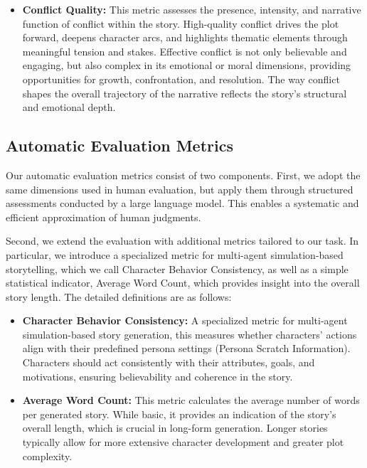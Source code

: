 \documentclass[letterpaper]{article} %
\begin{document}
\begin{itemize}
  \item \textbf{Conflict Quality:} This metric assesses the presence, intensity, and narrative function of conflict within the story. High-quality conflict drives the plot forward, deepens character arcs, and highlights thematic elements through meaningful tension and stakes. Effective conflict is not only believable and engaging, but also complex in its emotional or moral dimensions, providing opportunities for growth, confrontation, and resolution. The way conflict shapes the overall trajectory of the narrative reflects the story's structural and emotional depth.
  
\end{itemize}

\subsection{Automatic Evaluation Metrics}

Our automatic evaluation metrics consist of two components. First, we adopt the same dimensions used in human evaluation, but apply them through structured assessments conducted by a large language model. This enables a systematic and efficient approximation of human judgments.

Second, we extend the evaluation with additional metrics tailored to our task. In particular, we introduce a specialized metric for multi-agent simulation-based storytelling, which we call Character Behavior Consistency, as well as a simple statistical indicator, Average Word Count, which provides insight into the overall story length. The detailed definitions are as follows:

\begin{itemize}
  \item \textbf{Character Behavior Consistency:} A specialized metric for multi-agent simulation-based story generation, this measures whether characters' actions align with their predefined persona settings (Persona Scratch Information). Characters should act consistently with their attributes, goals, and motivations, ensuring believability and coherence in the story.
  
  \item \textbf{Average Word Count:} This metric calculates the average number of words per generated story. While basic, it provides an indication of the story's overall length, which is crucial in long-form generation. Longer stories typically allow for more extensive character development and greater plot complexity.
\end{itemize}
\end{document}
